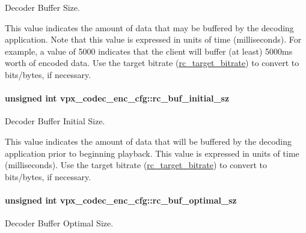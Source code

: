 Decoder Buffer Size. 

This value indicates the amount of data that may be buffered by the decoding application. Note that this value is expressed in units of time (milliseconds). For example, a value of 5000 indicates that the client will buffer (at least) 5000ms worth of encoded data. Use the target bitrate (\hyperlink{structvpx__codec__enc__cfg_ab8339685175d66710f482706cc9f0aed}{rc\+\_\+target\+\_\+bitrate}) to convert to bits/bytes, if necessary. 
\paragraph[{\texorpdfstring{rc\+\_\+buf\+\_\+initial\+\_\+sz}{rc_buf_initial_sz}}]{\setlength{\rightskip}{0pt plus 5cm}unsigned int vpx\+\_\+codec\+\_\+enc\+\_\+cfg\+::rc\+\_\+buf\+\_\+initial\+\_\+sz}\hypertarget{structvpx__codec__enc__cfg_aa9e4d6405994ef42d61d478cf6e0d5e0}{}\label{structvpx__codec__enc__cfg_aa9e4d6405994ef42d61d478cf6e0d5e0}


Decoder Buffer Initial Size. 

This value indicates the amount of data that will be buffered by the decoding application prior to beginning playback. This value is expressed in units of time (milliseconds). Use the target bitrate (\hyperlink{structvpx__codec__enc__cfg_ab8339685175d66710f482706cc9f0aed}{rc\+\_\+target\+\_\+bitrate}) to convert to bits/bytes, if necessary. 
\paragraph[{\texorpdfstring{rc\+\_\+buf\+\_\+optimal\+\_\+sz}{rc_buf_optimal_sz}}]{\setlength{\rightskip}{0pt plus 5cm}unsigned int vpx\+\_\+codec\+\_\+enc\+\_\+cfg\+::rc\+\_\+buf\+\_\+optimal\+\_\+sz}\hypertarget{structvpx__codec__enc__cfg_aafde485867e040a58504ad796e79e47f}{}\label{structvpx__codec__enc__cfg_aafde485867e040a58504ad796e79e47f}


Decoder Buffer Optimal Size. 

